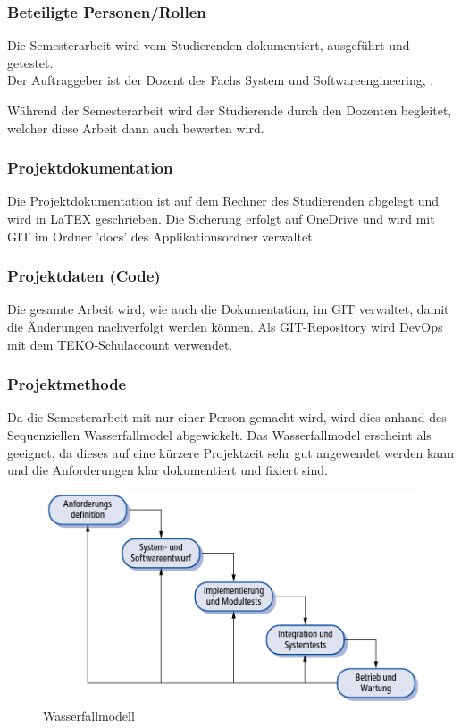 \subsubsection{Beteiligte Personen/Rollen}
Die Semesterarbeit wird vom Studierenden dokumentiert, ausgeführt und getestet.\\
Der Auftraggeber ist der Dozent des Fachs System und Softwareengineering, \gutachter.

Während der Semesterarbeit wird der Studierende durch den Dozenten \gutachter begleitet, welcher diese Arbeit dann auch bewerten wird.

\subsubsection{Projektdokumentation}
Die Projektdokumentation ist auf dem Rechner des Studierenden abgelegt und wird in LaTEX geschrieben. Die Sicherung erfolgt auf OneDrive und wird mit GIT im Ordner 'docs' des Applikationsordner verwaltet. 

\subsubsection{Projektdaten (Code)}
Die gesamte Arbeit wird, wie auch die Dokumentation, im GIT verwaltet, damit die Änderungen nachverfolgt werden können. Als GIT-Repository wird DevOps mit dem TEKO-Schulaccount verwendet.

\subsubsection{Projektmethode}
Da die Semesterarbeit mit nur einer Person gemacht wird, wird dies anhand des Sequenziellen Wasserfallmodel abgewickelt. Das Wasserfallmodel erscheint als geeignet, da dieses auf eine kürzere Projektzeit sehr gut angewendet werden kann und die Anforderungen klar dokumentiert und fixiert sind.

\begin{figure}[htp]
    \begin{center}
        \includegraphics[width=0.5\linewidth]{content/images/wasserfallmodell.png}
        \caption{Wasserfallmodell}
        \label{fig:wasserfallmodell}
      \end{center}
\end{figure}

